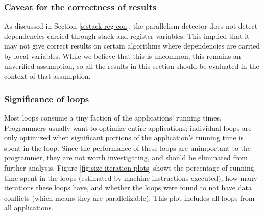 \documentclass[12pt,twoside]{reedthesis}
\begin{document}
		\subsubsection{Caveat for the correctness of results}
		
		As discussed in Section \ref{s:stack-reg-con}, the parallelism detector does not detect dependencies carried through stack and register variables. This implied that it may not give correct results on certain algorithms where dependencies are carried by local variables. While we believe that this is uncommon, this remains an unverified assumption, so all the results in this section should be evaluated in the context of that assumption.
		
		\subsubsection{Significance of loops}
		
		Most loops consume a tiny faction of the applications' running times. Programmers usually want to optimize entire applications; individual loops are only optimized when significant portions of the application's running time is spent in the loop. Since the performance of these loops are unimportant to the programmer, they are not worth investigating, and should be eliminated from further analysis.  
		Figure \ref{fig:size-iteration-plots} shows the percentage of running time spent in the loops (estimated by machine instructions executed), how many iterations these loops have, and whether the loops were found to not have data conflicts (which means they are parallelizable). This plot includes all loops from all applications. 
		
		
\end{document}
